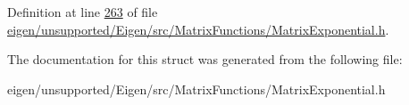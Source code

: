 Definition at line \hyperlink{eigen_2unsupported_2_eigen_2src_2_matrix_functions_2_matrix_exponential_8h_source_l00263}{263} of file \hyperlink{eigen_2unsupported_2_eigen_2src_2_matrix_functions_2_matrix_exponential_8h_source}{eigen/unsupported/\+Eigen/src/\+Matrix\+Functions/\+Matrix\+Exponential.\+h}.



The documentation for this struct was generated from the following file\+:\begin{DoxyCompactItemize}
\item 
eigen/unsupported/\+Eigen/src/\+Matrix\+Functions/\+Matrix\+Exponential.\+h\end{DoxyCompactItemize}
